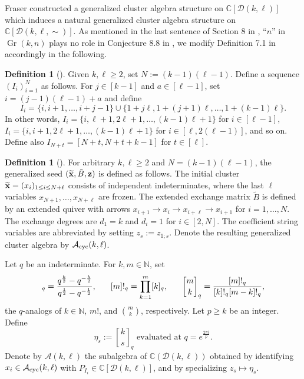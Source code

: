 \documentclass[11pt, reqno]{amsart}
\theoremstyle{plain}
\theoremstyle{definition}
\newtheorem{definition}[theorem]{Definition}
\numberwithin{equation}{section}
\DeclareMathOperator{\Gr}{Gr}
\begin{document}
Fraser constructed a generalized cluster algebra structure on $\mathbb{C}[\mathcal{D}(k, \ell)]$ which induces a natural generalized cluster algebra structure on $\mathbb{C}[\mathcal{D}(k, \ell, \sim)]$. As mentioned in the last sentence of Section 8 in \cite{Fra20}, ``$n$'' in $\Gr(k,n)$ plays no role in Conjecture 8.8 in \cite{Fra20}, we modify Definition 7.1 in \cite{Fra20} accordingly in the following. 
\begin{definition}[{\cite[Definition 7.1]{Fra20}}] \label{defn:initPluckers}
Given $k, \ell\geq 2$, set $N := (k-1)(\ell-1)$. Define a sequence $(I_i)_{i=1}^N$ as follows. 
For $j \in [k-1]$ and $a \in [\ell-1]$, set $i = (j-1)(\ell-1) + a$ and define 
\begin{equation}\label{eq:Ilist}
I_i = \{i, i+1, \dots, i+j-1\} \cup \{1+j\ell,1+(j+1)\ell,\dots,1+(k-1)\ell\}.
\end{equation}
In other words, $I_i = \{i,\ell+1,2\ell+1,\dots,(k-1)\ell+1\}$ for $i \in [\ell-1]$, $I_i = \{i,i+1,2\ell+1,\dots,(k-1)\ell+1\}$ for $i \in [\ell,2(\ell-1)]$, and so on. 
Define also $I_{N+t} = [N+t,N+t+k-1] $ for $t \in [\ell]$. 
\end{definition}

\begin{definition}[{\cite[Definition 7.2]{Fra20}}]\label{defn:abstract CS seed}
For arbitrary $k,\ell \geq 2$ and $N = (k-1)(\ell-1)$, the generalized seed $(\widetilde{\bf x},\tilde{B},{\bf z})$ is defined as follows. The initial cluster $\widetilde{\bf x} = (x_i)_{1 \le i \le N+\ell}$ consists of independent indeterminates, where the last $\ell$ variables $x_{N+1},\dots,x_{N+\ell}$ are frozen. The extended exchange matrix $\tilde{B}$ is defined by an extended quiver with arrows $x_{i+1} \to x_i \to x_{i+\ell} \to x_{i+1}$ for $i=1,\ldots,N$. The exchange degrees are $d_1 = k$ and $d_i = 1$ for $i \in [2,N]$. The coefficient string variables are abbreviated by setting $z_s := z_{1;s}$. Denote the resulting generalized cluster algebra by $\mathcal{A}_{\rm cyc}(k,\ell)$. 
\end{definition}


Let $q$ be an indeterminate. For $k,m \in \mathbb{N}$, set 
\begin{equation*}
[k]_q = \frac{q^{\frac{k}{2}}-q^{-\frac{k}{2}}}{q^{\frac{1}{2}}-q^{-\frac{1}{2}}}, \hspace{.6cm}  [m]!_q = \prod_{k=1}^m [k]_q, \hspace{.6cm} 
\genfrac{[}{]}{0pt}{}{m}{k}_q = \frac{[m]!_q}{[k]!_q [m-k]!_q}, 
\end{equation*}
the $q$-analogs of $k \in \mathbb{N}$, $m!$, and $\binom {m}{k}$, respectively. Let $p \ge k$ be an integer. Define
\begin{equation}\label{eq:coeffs}
\eta_{s} := \genfrac{[}{]}{0pt}{}{k}{s}_q \text{ evaluated at } q = e^{\frac{2\pi i}{p}}.
\end{equation}
Denote by $\mathcal{A}(k,\ell)$ the subalgebra of $ \mathbb{C}(\mathcal{D}(k,\ell))$ obtained by identifying  $x_i \in \mathcal{A}_{\rm cyc}(k,\ell)$ with $P_{I_i}\in\mathbb{C}[\mathcal{D}(k,\ell)]$, and by specializing $z_s \mapsto \eta_s$.
\end{document}
